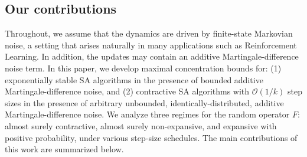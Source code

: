 \documentclass{article}
\begin{document}
\subsection{Our contributions}
{Throughout, we assume that the dynamics are driven by finite-state Markovian noise, a setting that arises naturally in many applications such as Reinforcement Learning. In addition, the updates may contain an additive Martingale-difference noise term. In this paper, we develop maximal concentration bounds for: (1) exponentially stable  SA algorithms in the presence of bounded additive Martingale-difference noise, and (2) contractive SA algorithms with $\mathcal O(1/k)$ step sizes in the presence of arbitrary unbounded, identically-distributed, additive Martingale-difference noise. We analyze three regimes for the random operator $F$: almost surely contractive, almost surely non-expansive, and expansive with positive probability, under various step-size schedules. The main contributions of this work are summarized below. }
\end{document}
